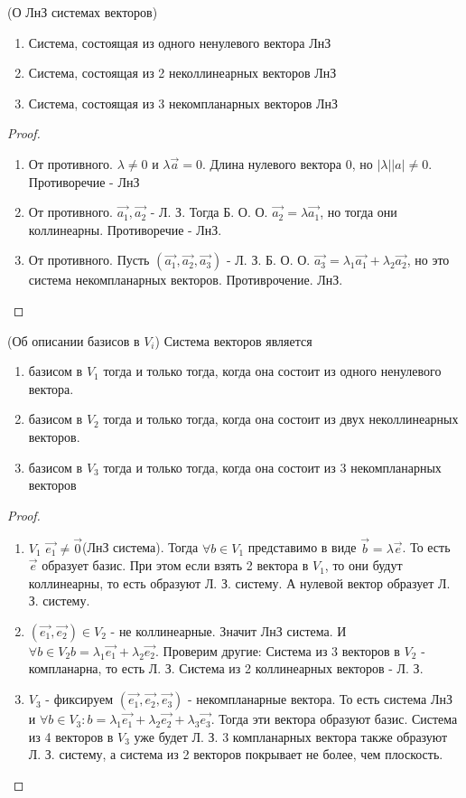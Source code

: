 	\begin{theorem}
		(О ЛнЗ системах векторов)
		\begin{enumerate}
			\item Система, состоящая из одного ненулевого вектора ЛнЗ
			\item Система, состоящая из 2 неколлинеарных векторов ЛнЗ
			\item Система, состоящая из 3 некомпланарных векторов ЛнЗ
		\end{enumerate}
	\end{theorem}
	\begin{proof}
		\begin{enumerate}
			\item От противного. $\lambda\ne 0$ и $\lambda\vec{a}=0$. Длина нулевого вектора 0, но
			$|\lambda||a|\ne0$. Противоречие - ЛнЗ
			\item От противного. $\vec{a_1}, \vec{a_2}$ - Л. З. Тогда Б. О. О. $\vec{a_2} = \lambda \vec{a_1}$, но тогда они коллинеарны. Противоречие - ЛнЗ.
			\item От противного. Пусть \((\vec{a_1}, \vec{a_2}, \vec{a_3})\) - Л. З. Б. О. О. $\vec{a_3} = \lambda_1\vec{a_1} + \lambda_2\vec{a_2}$, но это система некомпланарных векторов. Противрочение. ЛнЗ.
		\end{enumerate}
	\end{proof}
	\begin{theorem}
		(Об описании базисов в $V_i$) Система векторов является 
		\begin{enumerate}
			\item базисом в $V_1$ тогда и только тогда, когда она состоит из одного ненулевого вектора.
			\item базисом в $V_2$ тогда и только тогда, когда она состоит из двух неколлинеарных векторов.
			\item базисом в $V_3$ тогда и только тогда, когда она состоит из 3 некомпланарных векторов
		\end{enumerate}
	\end{theorem}
	\begin{proof}
		\begin{enumerate}
			\item \(V_1\) $\vec{e_1}\ne\vec{0}$(ЛнЗ система). Тогда $\forall b \in V_1$ представимо в виде $\vec{b} = \lambda \vec{e}$. То есть $\vec{e}$ образует базис. При этом если взять 2 вектора в $V_1$, то они будут коллинеарны, то есть образуют Л. З. систему. А нулевой вектор образует Л. З. систему.
			\item $(\vec{e_1}, \vec{e_2}) \in V_2$ - не коллинеарные. Значит ЛнЗ система. И $\forall b\in V_2 b = \lambda_1\vec{e_1}+\lambda_2\vec{e_2}$. Проверим другие: Система из 3 векторов в $V_2$ - компланарна, то есть Л. З. Система из 2 коллинеарных векторов - Л. З.
			\item $V_3$ - фиксируем \((\vec{e_1}, \vec{e_2}, \vec{e_3})\) - некомпланарные вектора. То есть система ЛнЗ и $\forall b \in V_3: b = \lambda_1\vec{e_1}+\lambda_2\vec{e_2}+\lambda_3\vec{e_3}$. Тогда эти вектора образуют базис. Система из 4 векторов в $V_3$ уже будет Л. З. 3 компланарных вектора также образуют Л. З. систему, а система из 2 векторов покрывает не более, чем плоскость.
		\end{enumerate}
	\end{proof}
